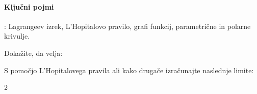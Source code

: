 \documentclass[11pt,a4paper]{exam}
\renewcommand{\leq}{\leqslant} %
\renewcommand{\{}{\lbrace}
\renewcommand{\}}{\rbrace}
\begin{document}
\paragraph{Ključni pojmi}: Lagrangeev izrek, L'Hopitalovo pravilo, grafi funkcij, parametrične in polarne krivulje.	
\begin{questions}
	\question Dokažite, da velja:

		\question S pomočjo L'Hopitalovega pravila ali kako drugače izračunajte naslednje limite:
		\begin{multicols}{2}
\end{multicols}
\end{questions}
\end{document}

